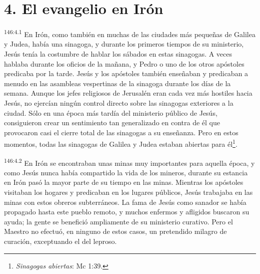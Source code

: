 \section*{4. El evangelio en Irón}
\par 
\textsuperscript{146:4.1} En Irón, como también en muchas de las ciudades más pequeñas de Galilea y Judea, había una sinagoga, y durante los primeros tiempos de su ministerio, Jesús tenía la costumbre de hablar los sábados en estas sinagogas. A veces hablaba durante los oficios de la mañana, y Pedro o uno de los otros apóstoles predicaba por la tarde. Jesús y los apóstoles también enseñaban y predicaban a menudo en las asambleas vespertinas de la sinagoga durante los días de la semana. Aunque los jefes religiosos de Jerusalén eran cada vez más hostiles hacia Jesús, no ejercían ningún control directo sobre las sinagogas exteriores a la ciudad. Sólo en una época más tardía del ministerio público de Jesús, consiguieron crear un sentimiento tan generalizado en contra de él que provocaron casi el cierre total de las sinagogas a su enseñanza. Pero en estos momentos, todas las sinagogas de Galilea y Judea estaban abiertas para él\footnote{\textit{Sinagogas abiertas}: Mc 1:39.}.

\par 
\textsuperscript{146:4.2} En Irón se encontraban unas minas muy importantes para aquella época, y como Jesús nunca había compartido la vida de los mineros, durante su estancia en Irón pasó la mayor parte de su tiempo en las minas. Mientras los apóstoles visitaban los hogares y predicaban en los lugares públicos, Jesús trabajaba en las minas con estos obreros subterráneos. La fama de Jesús como sanador se había propagado hasta este pueblo remoto, y muchos enfermos y afligidos buscaron su ayuda; la gente se benefició ampliamente de su ministerio curativo. Pero el Maestro no efectuó, en ninguno de estos casos, un pretendido milagro de curación, exceptuando el del leproso.

